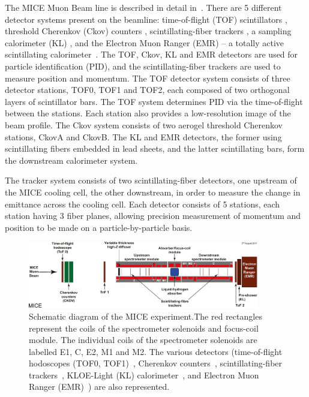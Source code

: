 \documentclass[11pt,a4paper]{article}
\begin{document}
The MICE Muon Beam line is described in detail in~\cite{BeamlineJINST}. There are 5 different detector systems present on the beamline: time-of-flight (TOF) scintillators \cite{NIMA_TOF}, threshold Cherenkov (Ckov) counters \cite{CkovIEEE}, scintillating-fiber trackers \cite{TrackersNIM}, a sampling calorimeter (KL) \cite{KLOE2, PionContaminationJINST}, and the Electron Muon Ranger (EMR) -- a totally active scintillating calorimeter~\cite{EMRJINST, EMRJINST11}. The TOF, Ckov, KL and EMR detectors are used for particle identification (PID), and the scintillating-fiber trackers are used to measure position and momentum. The TOF detector system consists of three detector stations, TOF0, TOF1 and TOF2, each composed of two orthogonal layers of scintillator bars.  The TOF system determines PID via the time-of-flight between the stations. Each station also provides a low-resolution image of the beam profile.  The Ckov system consists of two aerogel threshold Cherenkov stations, CkovA and CkovB. The KL and EMR detectors, the former using scintillating fibers embedded in lead sheets, and the latter scintillating bars, form the downstream calorimeter system.

The tracker system consists of two scintillating-fiber detectors, one upstream of the MICE cooling cell, the other downstream, in order to measure the change in emittance across the cooling cell. Each detector consists of 5 stations, each station having 3 fiber planes, allowing precision measurement of momentum and position to be made on a particle-by-particle basis.

\begin{figure}[!htb]
\centering
\includegraphics[width=0.9\textwidth]{figs/Step-4-labels.pdf}
\caption{Schematic diagram of the MICE experiment.The red rectangles represent the coils of the spectrometer solenoids and focus-coil module. The individual coils of the spectrometer solenoids are labelled E1, C, E2, M1 and M2. The various detectors (time-of-flight hodoscopes (TOF0, TOF1)~\cite{NIMA_TOF}, Cherenkov counters~\cite{CkovIEEE}, scintillating-fiber trackers~\cite{TrackersNIM}, KLOE-Light (KL) calorimeter~\cite{KLOE, KLOE2}, and Electron Muon Ranger (EMR)~\cite{EMRJINST, EMRJINST11}) are also represented.}
\label{fig:step4}
\end{figure}
\end{document}
